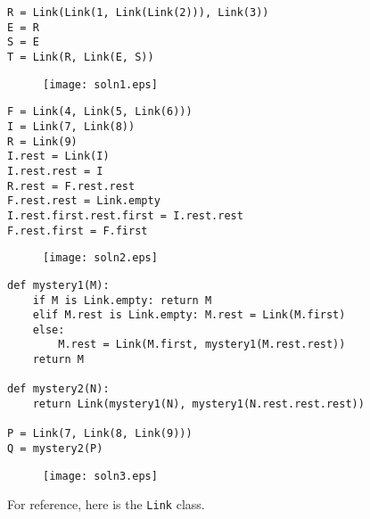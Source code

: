 \documentclass[twoside]{article}
\begin{document}
\begin{enumerate}
\newpage

\begin{verbatim}
R = Link(Link(1, Link(Link(2))), Link(3))
E = R
S = E
T = Link(R, Link(E, S))
\end{verbatim}

\vspace{0.05in}

\begin{figure}[ht!]
\hspace*{5mm}
\texttt{[image: soln1.eps]}
\end{figure}

\vspace{0.05in}

\begin{verbatim}
F = Link(4, Link(5, Link(6)))
I = Link(7, Link(8))
R = Link(9)
I.rest = Link(I)
I.rest.rest = I
R.rest = F.rest.rest
F.rest.rest = Link.empty
I.rest.first.rest.first = I.rest.rest
F.rest.first = F.first
\end{verbatim}

\vspace{0.05in}

\begin{figure}[ht!]
\hspace*{5mm}
\texttt{[image: soln2.eps]}
\end{figure}

\vspace{0.05in}

\begin{verbatim}
def mystery1(M):
    if M is Link.empty: return M
    elif M.rest is Link.empty: M.rest = Link(M.first)
    else:
        M.rest = Link(M.first, mystery1(M.rest.rest))
    return M

def mystery2(N):
    return Link(mystery1(N), mystery1(N.rest.rest.rest))

P = Link(7, Link(8, Link(9)))
Q = mystery2(P)
\end{verbatim}

\vspace{0.05in}

\begin{figure}[ht!]
\hspace*{5mm}
\texttt{[image: soln3.eps]}
\end{figure}

\vspace{0.05in}

\newpage

For reference, here is the \lstinline{Link} class.


\end{enumerate}
\end{document}
